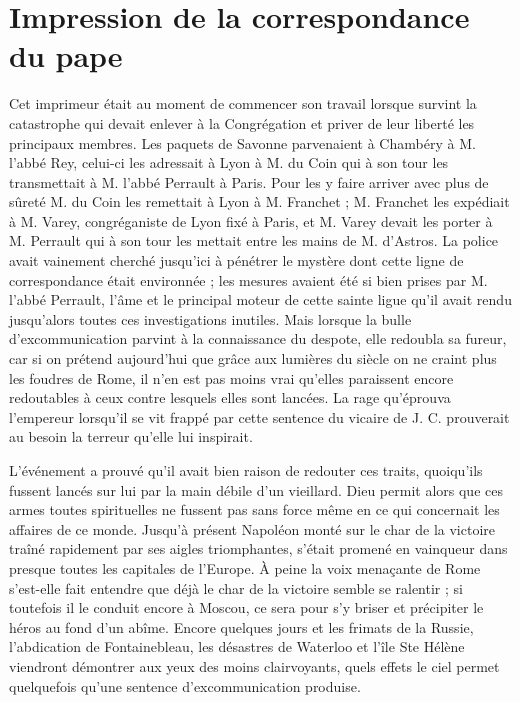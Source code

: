 \section*{Impression de la correspondance du pape}
Cet imprimeur était au moment de commencer son travail lorsque survint la catastrophe qui devait enlever à la Congrégation et priver de leur liberté les principaux membres. Les paquets de Savonne parvenaient à Chambéry à M. l'abbé Rey, celui-ci les adressait à Lyon à M. du Coin qui à son tour les transmettait à M. l'abbé Perrault à Paris. Pour les y faire arriver avec plus de sûreté M. du Coin les remettait à Lyon à M. Franchet ; M. Franchet les expédiait à M. Varey, congréganiste de Lyon fixé à Paris, et M. Varey devait les porter à M. Perrault qui à son tour les mettait entre les mains de M. d'Astros. La police avait
vainement cherché jusqu'ici à pénétrer le mystère dont cette ligne de correspondance était environnée ; les mesures avaient été si bien prises par M. l'abbé Perrault, l'âme et le principal moteur de cette sainte ligue qu'il avait rendu jusqu'alors toutes ces investigations inutiles. Mais lorsque la bulle d'excommunication parvint à la connaissance du despote, elle redoubla sa fureur, car si on prétend aujourd'hui que grâce aux lumières du siècle on ne craint plus les foudres de Rome, il n'en est pas moins vrai qu'elles paraissent encore redoutables à ceux contre lesquels elles sont lancées. La rage qu'éprouva l'empereur lorsqu'il se vit frappé par cette sentence du vicaire de J. C. prouverait au besoin la terreur qu'elle lui inspirait.

L'événement a prouvé qu'il avait bien raison de redouter ces traits, quoiqu'ils fussent lancés sur lui par la main débile d'un vieillard. Dieu permit alors que ces armes toutes spirituelles ne fussent pas sans force même en ce qui concernait les affaires de ce monde. Jusqu'à présent Napoléon monté sur le char de la victoire traîné rapidement par ses aigles triomphantes, s'était promené en vainqueur dans presque toutes les capitales de l'Europe. À peine la voix menaçante de Rome s'est-elle fait entendre que déjà le char de la victoire semble se ralentir ; si toutefois il le conduit encore à Moscou, ce sera pour s'y briser et précipiter le héros au fond d'un abîme. Encore quelques jours et les frimats de la Russie, l'abdication de Fontainebleau, les désastres de Waterloo et l'île Ste Hélène viendront démontrer aux yeux des moins
clairvoyants, quels effets le ciel permet quelquefois qu'une sentence d'excommunication produise.

